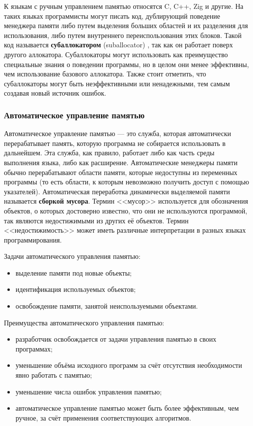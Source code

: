 К языкам с ручным управлением памятью относятся C, C++, Zig и другие. На таких языках программисты могут писать код, дублирующий поведение менеджера памяти либо путем выделения больших областей и их разделения для использования, либо путем внутреннего переиспользования этих блоков. Такой код называется \textbf{субаллокатором} (suballocator) \cite{glossary}, так как он работает поверх другого аллокатора. Субаллокаторы могут использовать как преимущество специальные знания о поведении программы, но в целом они менее эффективны, чем использование базового аллокатора. Также стоит отметить, что субаллокаторы могут быть неэффективными или ненадежными, тем самым создавая новый источник ошибок. \cite{allocator}



\subsubsection{Автоматическое управление памятью}

Автоматическое управление памятью \cite{mm_overview} --- это служба, которая автоматически перерабатывает память, которую программа не собирается использовать в дальнейшем. Эта служба, как правило, работает либо как часть среды выполнения языка, либо как расширение. Автоматические менеджеры памяти обычно перерабатывают области памяти, которые недоступны из переменных программы (то есть области, к которым невозможно получить доступ с помощью указателей). Автоматическая переработка динамически выделяемой памяти называется \textbf{сборкой мусора}. Термин <<мусор>> используется для обозначения объектов, о которых достоверно известно, что они не используются программой, так являются недостижимыми из других её объектов. Термин <<недостижимость>> может иметь различные интерпретации в разных языках программирования. \cite{glossary}

Задачи автоматического управления памятью: 

\begin{itemize}[label*=---]
	\item выделение памяти под новые объекты;
	\item идентификация используемых объектов;
	\item освобождение памяти, занятой неиспользуемыми объектами.
\end{itemize}

Преимущества автоматического управления памятью: 

\begin{itemize}[label*=---]
	\item разработчик освобождается от задачи управления памятью в своих программах;
	\item уменьшение объёма исходного программ за счёт отсутствия необходимости явно работать с памятью;
	\item уменьшение числа ошибок управления памятью;
	\item автоматическое управление памятью может быть более эффективным, чем ручное, за счёт применения соответствующих алгоритмов.
\end{itemize}

